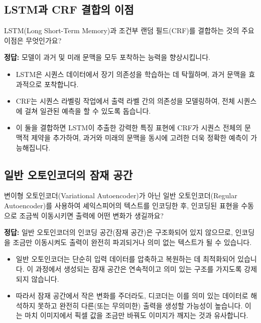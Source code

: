 \documentclass[11pt,a4paper]{article}
\theoremstyle{definition}
\begin{document}
\subsection{LSTM과 CRF 결합의 이점}
\begin{tcolorbox}[mybox, title={질문 2: LSTM과 CRF 결합의 이점}]
LSTM(Long Short-Term Memory)과 조건부 랜덤 필드(CRF)를 결합하는 것의 주요 이점은 무엇인가요?
\end{tcolorbox}

\begin{tcolorbox}[summary, title={정답 및 설명}]
\textbf{정답:} 모델이 과거 및 미래 문맥을 모두 포착하는 능력을 향상시킵니다.
\begin{itemize}
    \item LSTM은 시퀀스 데이터에서 장기 의존성을 학습하는 데 탁월하며, 과거 문맥을 효과적으로 포착합니다.
    \item CRF는 시퀀스 라벨링 작업에서 출력 라벨 간의 의존성을 모델링하여, 전체 시퀀스에 걸쳐 일관된 예측을 할 수 있도록 돕습니다.
    \item 이 둘을 결합하면 LSTM이 추출한 강력한 특징 표현에 CRF가 시퀀스 전체의 문맥적 제약을 추가하여, 과거와 미래의 문맥을 동시에 고려한 더욱 정확한 예측이 가능해집니다.
\end{itemize}
\end{tcolorbox}

\subsection{일반 오토인코더의 잠재 공간}
\begin{tcolorbox}[mybox, title={질문 3: 일반 오토인코더의 잠재 공간}]
변이형 오토인코더(Variational Autoencoder)가 아닌 일반 오토인코더(Regular Autoencoder)를 사용하여 셰익스피어의 텍스트를 인코딩한 후, 인코딩된 표현을 수동으로 조금씩 이동시키면 출력에 어떤 변화가 생길까요?
\end{tcolorbox}

\begin{tcolorbox}[summary, title={정답 및 설명}]
\textbf{정답:} 일반 오토인코더의 인코딩 공간(잠재 공간)은 구조화되어 있지 않으므로, 인코딩을 조금만 이동시켜도 출력이 완전히 파괴되거나 의미 없는 텍스트가 될 수 있습니다.
\begin{itemize}
    \item 일반 오토인코더는 단순히 입력 데이터를 압축하고 복원하는 데 최적화되어 있습니다. 이 과정에서 생성되는 잠재 공간은 연속적이고 의미 있는 구조를 가지도록 강제되지 않습니다.
    \item 따라서 잠재 공간에서 작은 변화를 주더라도, 디코더는 이를 의미 있는 데이터로 해석하지 못하고 완전히 다른(또는 무의미한) 출력을 생성할 가능성이 높습니다. 이는 마치 이미지에서 픽셀 값을 조금만 바꿔도 이미지가 깨지는 것과 유사합니다.
\end{itemize}
\end{tcolorbox}
\end{document}
